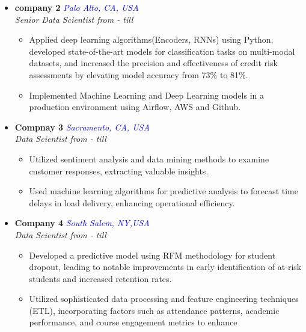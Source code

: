 \documentclass{article}
\begin{document}
\begin{itemize}[left=0pt]
  \item \textbf{company 2} \hfill \textcolor{blue}{\emph{Palo Alto, CA, USA}} \\
  \emph{Senior Data Scientist \hfill from - till}
  \begin{itemize}
    \item Applied deep learning algorithms(Encoders, RNNs) using Python, developed state-of-the-art models for classification tasks on multi-modal datasets, and increased the precision and effectiveness of credit risk assessments by elevating model accuracy from 73\% to 81\%.
    \item Implemented Machine Learning and Deep Learning models in a production environment using Airflow, AWS and Github.
     
  \end{itemize}
\end{itemize}

\begin{itemize}[left=0pt]
  \item \textbf{Compnay 3} \hfill \textcolor{blue}{\emph{Sacramento, CA, USA}} \\
  \emph{Data Scientist \hfill from - till}
  \begin{itemize}
    \item Utilized sentiment analysis and data mining methods to examine customer responses, extracting valuable insights. 
    \item Used machine learning algorithms for predictive analysis to forecast time delays in load delivery, enhancing operational efficiency.
  \end{itemize}
\end{itemize}

\begin{itemize}[left=0pt]
  \item \textbf{Company 4} \hfill \textcolor{blue}{\emph{South Salem, NY,USA}} \\
  \emph{Data Scientist \hfill from - till}
  \begin{itemize}
    \item Developed a predictive model using RFM methodology for student dropout, leading to notable improvements in early identification of at-risk students and increased retention rates.
    \item Utilized sophisticated data processing and feature engineering techniques (ETL), incorporating factors such as attendance patterns, academic performance, and course engagement metrics to enhance
  \end{itemize}
\end{itemize}
\end{document}
